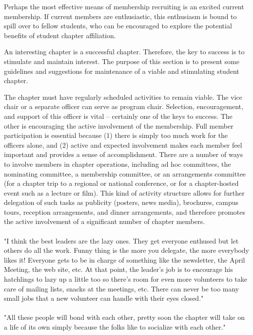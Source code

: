 Perhaps the most effective means of membership recruiting is an excited current
membership. If current members are enthusiastic, this enthusiasm is bound to
spill over to fellow students, who can be encouraged to explore the potential
benefits of student chapter affiliation.

An interesting chapter is a successful chapter. Therefore, the key to success is
to stimulate and maintain interest. The purpose of this section is to present
some guidelines and suggestions for maintenance of a viable and stimulating
student chapter.

The chapter must have regularly scheduled activities to remain viable. The vice
chair or a separate officer can serve as program chair. Selection, encouragement,
and support of this officer is vital -- certainly one of the keys to success.
The other is encouraging the active involvement of the membership. Full member
participation is essential because (1) there is simply too much work for the
officers alone, and (2) active and expected involvement makes each member feel
important and provides a sense of accomplishment. There are a number of ways to
involve members in chapter operations, including ad hoc committees, the
nominating committee, a membership committee, or an arrangements committee (for
a chapter trip to a regional or national conference, or for a chapter-hosted
event such as a lecture or film). This kind of activity structure allows for
further delegation of such tasks as publicity (posters, news media), brochures,
campus tours, reception arrangements, and dinner arrangements, and therefore
promotes the active involvement of a significant number of chapter members.
\\
\\
"I think the best leaders are the lazy ones. They get everyone enthused but let
others do all the work. Funny thing is the more you delegate, the more everybody
likes it! Everyone gets to be in charge of something like the newsletter, the
April Meeting, the web site, etc. At that point, the leader's job is to encourage
his hatchlings to lazy up a little too so there's room for even more volunteers
to take care of mailing lists, snacks at the meetings, etc. There can never be
too many small jobs that a new volunteer can handle with their eyes closed."\\
\\
"All these people will bond with each other, pretty soon the chapter will take
on a life of its own simply because the folks like to socialize with each other."


